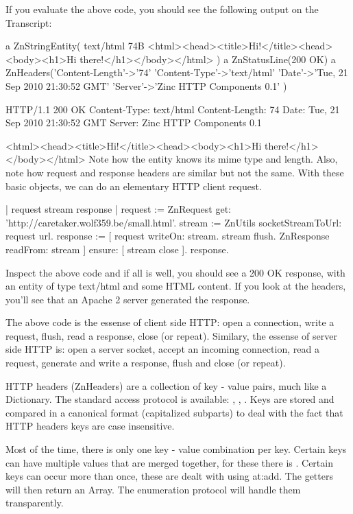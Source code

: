 \documentclass[a4paper,10pt,twoside]{book}
\begin{document}
If you evaluate the above code, you should see the following output on the Transcript:

a ZnStringEntity( text/html 74B <html><head><title>Hi!</title><head><body><h1>Hi there!</h1></body></html> )
a ZnStatusLine(200 OK)
a ZnHeaders('Content-Length'->'74' 'Content-Type'->'text/html' 'Date'->'Tue, 21 Sep 2010 21:30:52 GMT' 
'Server'->'Zinc HTTP Components 0.1' )

HTTP/1.1 200 OK
Content-Type: text/html
Content-Length: 74
Date: Tue, 21 Sep 2010 21:30:52 GMT
Server: Zinc HTTP Components 0.1

<html><head><title>Hi!</title><head><body><h1>Hi there!</h1></body></html>
Note how the entity knows its mime type and length. Also, note how request and response headers are similar but not the same. With these basic objects, we can do an elementary HTTP client request.

\begin{code}{}
| request stream response |
request := ZnRequest get: 'http://caretaker.wolf359.be/small.html'.
stream := ZnUtils socketStreamToUrl: request url.
response := [ 
  request writeOn: stream. 
  stream flush. 
  ZnResponse readFrom: stream ] ensure: [ stream close ].
response.
\end{code}

Inspect the above code and if all is well, you should see a 200 OK response, with an entity of type text/html and some HTML content. If you look at the headers, you'll see that an Apache 2 server generated the response.

The above code is the essense of client side HTTP: open a connection, write a request, flush, read a response, close (or repeat). Similary, the essense of server side HTTP is: open a server socket, accept an incoming connection, read a request, generate and write a response, flush and close (or repeat).

HTTP headers (ZnHeaders) are a collection of key - value pairs, much like a Dictionary. The standard access protocol is available: , , . Keys are stored and compared in a canonical format (capitalized subparts) to deal with the fact that HTTP headers keys are case insensitive.

Most of the time, there is only one key - value combination per key. Certain keys can have multiple values that are merged together, for these there is . Certain keys can occur more than once, these are dealt with using  at:add. The getters will then return an Array. The enumeration protocol will handle them transparently.
\end{document}
